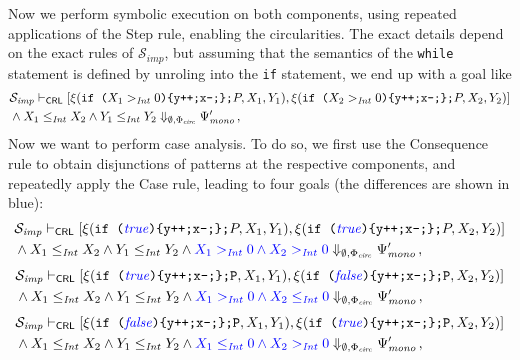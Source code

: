 Now we perform symbolic execution on both components, using repeated applications of the Step rule,
enabling the circularities.
The exact details depend on the exact rules of $\mathcal{S}_{\mathit{imp}}$, but assuming that the semantics of
the \texttt{while} statement is defined by unroling into the \texttt{if} statement,
we end up with a goal like
\begin{align*}
  & \mathcal{S}_{\mathit{imp}} \vdash_{\mathsf{CRL}}
  [ \xi(\texttt{if (}X_1 >_{\mathit{Int}} 0 \texttt{)\{y++;x--;\};}P, X_1, Y_1),  
    \xi(\texttt{if (}X_2 >_{\mathit{Int}} 0 \texttt{)\{y++;x--;\};}P, X_2, Y_2) ] \\
  & \land X_1 \leq_{\mathit{Int}} X_2 \land Y_1 \leq_{\mathit{Int}} Y_2
  \Downarrow_{\emptyset, \Phi_{\mathit{circ}}} \Psi^\prime_{\mathit{mono}} \, ,
\end{align*}
Now we want to perform case analysis. To do so, we first use the Consequence rule to
obtain disjunctions of patterns at the respective components, and repeatedly apply the Case rule, leading to four goals
(the differences are shown in {\color{blue}blue}):
\begin{equation}\label{ex:case1}
\begin{aligned}
  & \mathcal{S}_{\mathit{imp}} \vdash_{\mathsf{CRL}}
  [ \xi(\texttt{if (}{\color{blue}\mathit{true}}\texttt{)\{y++;x--;\};}P, X_1, Y_1),  
    \xi(\texttt{if (}{\color{blue}\mathit{true}}\texttt{)\{y++;x--;\};}P, X_2, Y_2) ] \\
  & \land X_1 \leq_{\mathit{Int}} X_2 \land Y_1 \leq_{\mathit{Int}} Y_2 \land {\color{blue} X_1 >_{\mathit{Int}} 0 \land X_2 >_{\mathit{Int}} 0 }
  \Downarrow_{\emptyset, \Phi_{\mathit{circ}}} \Psi^\prime_{\mathit{mono}} \, ,
\end{aligned}
\end{equation}
\begin{equation}\label{ex:case2}
\begin{aligned}
  & \mathcal{S}_{\mathit{imp}} \vdash_{\mathsf{CRL}}
  [ \xi(\texttt{if (}{\color{blue}\mathit{true}}\texttt{)\{y++;x--;\};P}, X_1, Y_1),  
    \xi(\texttt{if (}{\color{blue}\mathit{false}}\texttt{)\{y++;x--;\};P}, X_2, Y_2) ] \\
  & \land X_1 \leq_{\mathit{Int}} X_2 \land Y_1 \leq_{\mathit{Int}} Y_2 \land {\color{blue} X_1 >_{\mathit{Int}} 0 \land X_2 \leq_{\mathit{Int}} 0 }
  \Downarrow_{\emptyset, \Phi_{\mathit{circ}}} \Psi^\prime_{\mathit{mono}} \, ,
\end{aligned}
\end{equation}
\begin{equation}\label{ex:case3}
\begin{aligned}
  & \mathcal{S}_{\mathit{imp}} \vdash_{\mathsf{CRL}}
  [ \xi(\texttt{if (}{\color{blue}\mathit{false}}\texttt{)\{y++;x--;\};P}, X_1, Y_1),  
    \xi(\texttt{if (}{\color{blue}\mathit{true}}\texttt{)\{y++;x--;\};P}, X_2, Y_2) ] \\
  & \land X_1 \leq_{\mathit{Int}} X_2 \land Y_1 \leq_{\mathit{Int}} Y_2 \land {\color{blue} X_1 \leq_{\mathit{Int}} 0 \land X_2 >_{\mathit{Int}} 0 }
  \Downarrow_{\emptyset, \Phi_{\mathit{circ}}} \Psi^\prime_{\mathit{mono}} \, ,
\end{aligned}
\end{equation}

